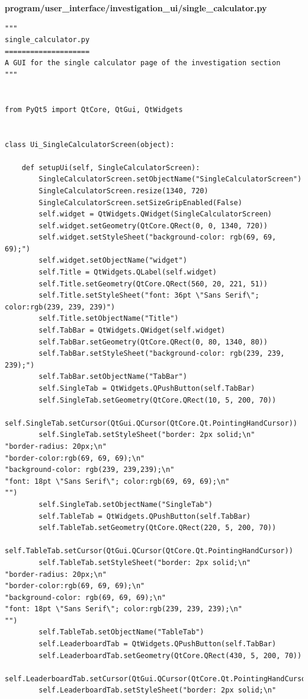 \documentclass{article}
\begin{document}
\textbf{program/user\_interface/investigation\_ui/single\_calculator.py}
\begin{lstlisting}
"""
single_calculator.py
====================
A GUI for the single calculator page of the investigation section
"""


from PyQt5 import QtCore, QtGui, QtWidgets


class Ui_SingleCalculatorScreen(object):

    def setupUi(self, SingleCalculatorScreen):
        SingleCalculatorScreen.setObjectName("SingleCalculatorScreen")
        SingleCalculatorScreen.resize(1340, 720)
        SingleCalculatorScreen.setSizeGripEnabled(False)
        self.widget = QtWidgets.QWidget(SingleCalculatorScreen)
        self.widget.setGeometry(QtCore.QRect(0, 0, 1340, 720))
        self.widget.setStyleSheet("background-color: rgb(69, 69, 69);")
        self.widget.setObjectName("widget")
        self.Title = QtWidgets.QLabel(self.widget)
        self.Title.setGeometry(QtCore.QRect(560, 20, 221, 51))
        self.Title.setStyleSheet("font: 36pt \"Sans Serif\"; color:rgb(239, 239, 239)")
        self.Title.setObjectName("Title")
        self.TabBar = QtWidgets.QWidget(self.widget)
        self.TabBar.setGeometry(QtCore.QRect(0, 80, 1340, 80))
        self.TabBar.setStyleSheet("background-color: rgb(239, 239, 239);")
        self.TabBar.setObjectName("TabBar")
        self.SingleTab = QtWidgets.QPushButton(self.TabBar)
        self.SingleTab.setGeometry(QtCore.QRect(10, 5, 200, 70))
        self.SingleTab.setCursor(QtGui.QCursor(QtCore.Qt.PointingHandCursor))
        self.SingleTab.setStyleSheet("border: 2px solid;\n"
"border-radius: 20px;\n"
"border-color:rgb(69, 69, 69);\n"
"background-color: rgb(239, 239,239);\n"
"font: 18pt \"Sans Serif\"; color:rgb(69, 69, 69);\n"
"")
        self.SingleTab.setObjectName("SingleTab")
        self.TableTab = QtWidgets.QPushButton(self.TabBar)
        self.TableTab.setGeometry(QtCore.QRect(220, 5, 200, 70))
        self.TableTab.setCursor(QtGui.QCursor(QtCore.Qt.PointingHandCursor))
        self.TableTab.setStyleSheet("border: 2px solid;\n"
"border-radius: 20px;\n"
"border-color:rgb(69, 69, 69);\n"
"background-color: rgb(69, 69, 69);\n"
"font: 18pt \"Sans Serif\"; color:rgb(239, 239, 239);\n"
"")
        self.TableTab.setObjectName("TableTab")
        self.LeaderboardTab = QtWidgets.QPushButton(self.TabBar)
        self.LeaderboardTab.setGeometry(QtCore.QRect(430, 5, 200, 70))
        self.LeaderboardTab.setCursor(QtGui.QCursor(QtCore.Qt.PointingHandCursor))
        self.LeaderboardTab.setStyleSheet("border: 2px solid;\n"

\end{lstlisting}
\end{document}
